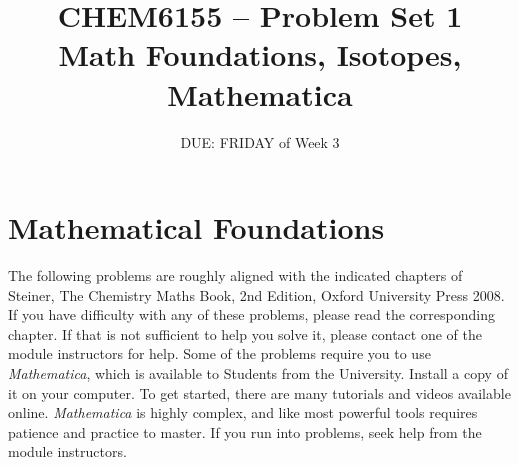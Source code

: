 \documentclass{chem6155problemset}
\title{CHEM6155 -- Problem Set 1\\Math Foundations, Isotopes, Mathematica}
\date{DUE: FRIDAY of Week 3}
\begin{document}
\maketitle

\section{Mathematical Foundations}
The following problems are roughly aligned with the indicated chapters of Steiner, The Chemistry
Maths Book, 2nd Edition, Oxford University Press 2008. If you have difficulty with any
of these problems, please read the corresponding chapter. If that is not sufficient
to help you solve it, please contact one of the module instructors for help. Some of the problems
require you to use \emph{Mathematica}, which is available to Students from the University. 
Install a copy of it on your computer. To get started, there are many tutorials and videos
available online. \emph{Mathematica} is highly complex, and like most powerful tools requires
patience and practice to master. If you run into problems, seek help from the module instructors.
\end{document}
